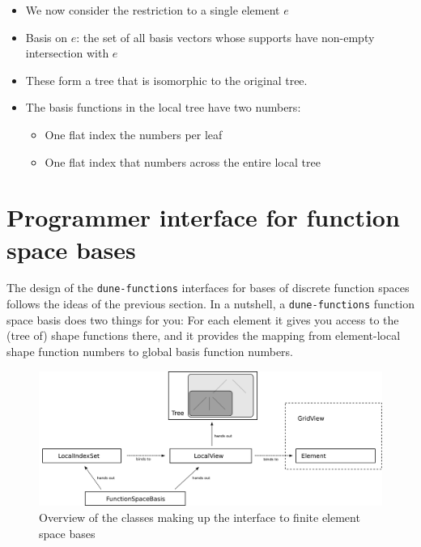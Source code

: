 \documentclass[a4paper,10pt,headings=normal,bibliography=totoc]{scrartcl}
\newcommand{\dunemodule}[1]{\texttt{#1}}
\begin{document}
\begin{itemize}
 \item We now consider the restriction to a single element $e$
 \item Basis on $e$: the set of all basis vectors whose supports have non-empty
   intersection with $e$
 \item These form a tree that is isomorphic to the original tree.
 \item The basis functions in the local tree have two numbers:
   \begin{itemize}
    \item One flat index the numbers per leaf
    \item One flat index that numbers across the entire local tree
   \end{itemize}
\end{itemize}


\section{Programmer interface for function space bases}
\label{sec:dune_functions:function_space_bases_implementation}

The design of the \dunemodule{dune-functions} interfaces for bases of discrete function spaces
follows the ideas of the previous section.  In a nutshell, a \dunemodule{dune-functions} function space basis
does two things for you: For each element it gives you access to the (tree of) shape functions there,
and it provides the mapping from element-local shape function numbers to global basis function numbers.

\begin{figure}
 \begin{center}
  \includegraphics[width=\textwidth]{febasis_interface_schematic}
 \end{center}
 \caption{Overview of the classes making up the interface to finite element space bases}
 \label{fig:dune_functions:febasis_interface_schematic}
\end{figure}
\end{document}

